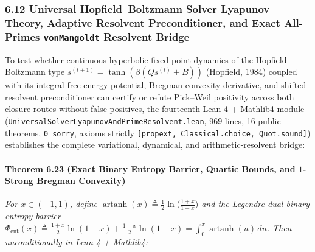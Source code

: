 \documentclass[
  11pt,
]{article}
\begin{document}
\subsubsection{\texorpdfstring{6.12 Universal Hopfield--Boltzmann Solver
Lyapunov Theory, Adaptive Resolvent Preconditioner, and Exact All-Primes
\texttt{vonMangoldt} Resolvent
Bridge}{6.12 Universal Hopfield--Boltzmann Solver Lyapunov Theory, Adaptive Resolvent Preconditioner, and Exact All-Primes vonMangoldt Resolvent Bridge}}\label{universal-hopfieldboltzmann-solver-lyapunov-theory-adaptive-resolvent-preconditioner-and-exact-all-primes-vonmangoldt-resolvent-bridge}

To test whether continuous hyperbolic fixed-point dynamics of the
Hopfield--Boltzmann type \(s^{(t+1)} = \tanh(\beta(Q s^{(t)} + B))\)
(Hopfield, 1984) coupled with its integral free-energy potential,
Bregman convexity derivative, and shifted-resolvent preconditioner can
certify or refute Pick--Weil positivity across both closure routes
without false positives, the fourteenth Lean 4 + Mathlib4 module
(\texttt{UniversalSolverLyapunovAndPrimeResolvent.lean}, 969 lines, 16
public theorems, \texttt{0\ sorry}, axioms strictly
\texttt{{[}propext,\ Classical.choice,\ Quot.sound{]}}) establishes the
complete variational, dynamical, and arithmetic-resolvent bridge:

\paragraph{\texorpdfstring{Theorem 6.23 (Exact Binary Entropy Barrier,
Quartic Bounds, and \(1\)-Strong Bregman
Convexity)}{Theorem 6.23 (Exact Binary Entropy Barrier, Quartic Bounds, and 1-Strong Bregman Convexity)}}\label{theorem-6.23-exact-binary-entropy-barrier-quartic-bounds-and-1-strong-bregman-convexity}

\emph{For \(x \in (-1, 1)\), define
\(\operatorname{artanh}(x) \triangleq \frac{1}{2}\ln\big(\frac{1+x}{1-x}\big)\)
and the Legendre dual binary entropy barrier
\(\Phi_{\text{ent}}(x) \triangleq \frac{1+x}{2}\ln(1+x) + \frac{1-x}{2}\ln(1-x) = \int_0^x \operatorname{artanh}(u)\,du\).
Then unconditionally in Lean 4 + Mathlib4:}
\end{document}
